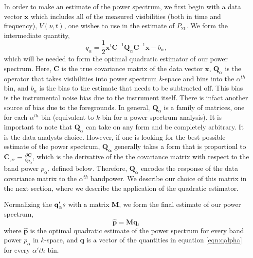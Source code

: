 \documentclass[twocolumn,numberedappendix]{emulateapj} \shorttitle{PSA64}
\newcommand{\x}{\mathbf{x}} \newcommand{\xhat}{\hat{\mathbf{x}}}
\begin{document}
In order to make an estimate of the power spectrum, we first begin with a data
vector $\x$ which includes all of the measured  visibilities (both in time and
frequency), $V(\nu,t)$, one wishes to use in the estimate of $P_{21}$. We form
the intermediate quantity,
\begin{equation}
\label{eqn:qalpha}
    q_{\alpha} = \frac{1}{2}\x^{t}\mathbf{C}^{-1}\mathbf{Q}_{\alpha}\mathbf{C}^{-1}\x - b_{\alpha},
\end{equation}
which will be needed to form the optimal quadratic estimator of our power spectrum.
Here, $\mathbf{C}$ is the true covariance matrix of the data vector $\x$, 
$\mathbf{Q}_{\alpha}$ is the operator that takes visibilities into power spectrum
$k$-space and bins into the ${\alpha}^{th}$ bin, and $b_{\alpha}$ is the bias to
the estimate that needs to be subtracted off. This bias is the instrumental
noise bias due to the instrument itself. There is infact another source of bias
due to the foregrounds. In general, $\mathbf{Q}_{\alpha}$
is a family of matrices, one for each $\alpha^{th}$ bin (equivalent to $k$-bin
for a power spectrum analysis). It is important to note that
$\mathbf{Q}_{\alpha}$ can take on any form and be completely arbitrary. It is
the data analysts choice. However, if one is looking for the best possible
estimate of the power spectrum,  $\mathbf{Q_{\alpha}}$ generally
takes a form that is proportionl to  $\mathbf{C}_{,\alpha} \equiv
\frac{\partial{\mathbf{C}}}{\partial p_{\alpha}}$, which is the derivative of
the the covariance matrix with respect to the band power $p_{\alpha}$, defined
below.  Therefore, $\mathbf{Q}_{\alpha}$ encodes the response of the data
covariance matrix to the $\alpha^{th}$ bandpower. We describe our choice of this
matrix in the next section, where we describe the application of the quadratic
estimator. 

Normalizing the $\mathbf{q}_{\alpha}'s$ with a matrix $\mathbf{M}$, we form
the final estimate of our power spectrum,
\begin{equation}
    \mathbf{\hat{p}} = \mathbf{M}\mathbf{q},
\end{equation}
where $\mathbf{\hat{p}}$ is the optimal quadratic estimate of the power spectrum
for every band power $p_{\alpha}$ in $k$-space, and $\mathbf{q}$ is a vector of the
quantities in equation \ref{eqn:qalpha} for every $\alpha'th$ bin.
\end{document}
